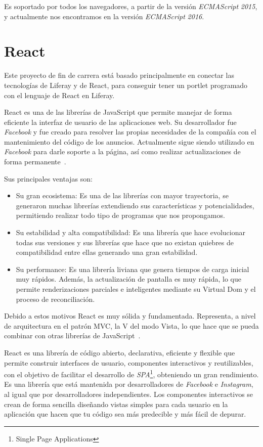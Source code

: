 \documentclass[a4paper, 12pt]{book}
\begin{document}
Es soportado por todos los navegadores, a partir de la versión \textit{ECMAScript} \textit{2015}, y actualmente nos encontramos en la versión \textit{ECMAScript} \textit{2016}.



\section{React}
\label{subsec:react}
Este proyecto de fin de carrera está basado principalmente en conectar las tecnologías de Liferay y de React, para conseguir tener un portlet programado con el lenguaje de React en Liferay.

\vspace{5mm}
React es una de las librerías de JavaScript que permite manejar de forma eficiente la interfaz de usuario de las aplicaciones web. Su desarrollador fue \textit{Facebook} y fue creado para resolver las propias necesidades de la compañía con el mantenimiento del código de los anuncios. Actualmente sigue siendo utilizado en \textit{Facebook} para darle soporte a la página, así como realizar actualizaciones de forma permanente~\cite{react_misc}.

\vspace{5mm}
Sus principales ventajas son:

\begin{itemize}
\item Su gran ecosistema: Es una de las librerías con mayor trayectoria, se generaron muchas librerías extendiendo sus características y potencialidades, permitiendo realizar todo tipo de programas que nos propongamos.
\item Su estabilidad y alta compatibilidad: Es una librería que hace evolucionar todas sus versiones y sus librerías que hace que no existan quiebres de compatibilidad entre ellas generando una gran estabilidad.
\item Su performance: Es una librería liviana que genera tiempos de carga inicial muy rápidos. Además, la actualización de pantalla es muy rápida, lo que permite renderizaciones parciales e inteligentes mediante su Virtual Dom y el proceso de reconciliación.
\end{itemize}

Debido a estos motivos React es muy sólida y fundamentada. Representa, a nivel de arquitectura en el patrón MVC, la V del modo Vista, lo que hace que se pueda combinar con otras librerías de JavaScript~\cite{react_book}.

\vspace{5mm}
React es una librería de código abierto, declarativa, eficiente y flexible que permite construir interfaces de usuario, componentes interactivos y reutilizables, con el objetivo de facilitar el desarrollo de \textit{SPA}\footnote{Single Page Applications}, obteniendo un gran rendimiento. Es una librería que está mantenida por desarrolladores de \textit{Facebook} e \textit{Instagram}, al igual que por desarrolladores independientes. Los componentes interactivos se crean de forma sencilla diseñando vistas simples para cada usuario en la aplicación que hacen que tu código sea más predecible y más fácil de depurar. 
\end{document}
